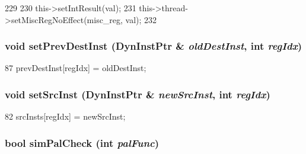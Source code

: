 \begin{DoxyCode}
229 {
230     this->setIntResult(val);
231     this->thread->setMiscRegNoEffect(misc_reg, val);
232 }
\end{DoxyCode}
\hypertarget{classOzoneDynInst_ae4ceee955b690a2898e5a0c609c9697d}{
\subsubsection[{setPrevDestInst}]{\setlength{\rightskip}{0pt plus 5cm}void setPrevDestInst ({\bf DynInstPtr} \& {\em oldDestInst}, \/  int {\em regIdx})}}
\label{classOzoneDynInst_ae4ceee955b690a2898e5a0c609c9697d}



\begin{DoxyCode}
87     { prevDestInst[regIdx] = oldDestInst; }
\end{DoxyCode}
\hypertarget{classOzoneDynInst_a3df27bece3830b65ac7c0a8868fff9d8}{
\subsubsection[{setSrcInst}]{\setlength{\rightskip}{0pt plus 5cm}void setSrcInst ({\bf DynInstPtr} \& {\em newSrcInst}, \/  int {\em regIdx})}}
\label{classOzoneDynInst_a3df27bece3830b65ac7c0a8868fff9d8}



\begin{DoxyCode}
82     { srcInsts[regIdx] = newSrcInst; }
\end{DoxyCode}
\hypertarget{classOzoneDynInst_a461205960be9d52e9beda48a77e9c600}{
\subsubsection[{simPalCheck}]{\setlength{\rightskip}{0pt plus 5cm}bool simPalCheck (int {\em palFunc})}}
\label{classOzoneDynInst_a461205960be9d52e9beda48a77e9c600}



